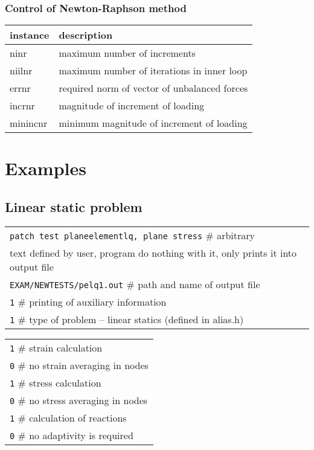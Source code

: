 \subsubsection{Control of Newton-Raphson method}

\begin{tabular}{|l|l|}
\hline
instance & description
\\ \hline
ninr &  maximum number of increments
\\ \hline
niilnr & maximum number of iterations in inner loop
\\ \hline
errnr & required norm of vector of unbalanced forces
\\ \hline
incrnr & magnitude of increment of loading
\\ \hline
minincnr & minimum magnitude of increment of loading
\\ \hline
\end{tabular}
  
\section{Examples}
\clearpage
\subsection{Linear static problem}

\noindent
\begin{tabular}{l}
{\tt patch test planeelementlq, plane stress} $\#$ arbitrary
\\
text defined by user, program do nothing with it, only
prints it into output file
\\
{\tt EXAM/NEWTESTS/pelq1.out} $\#$ path and name of output file
\\
{\tt 1} $\#$ printing of auxiliary information
\\
{\tt 1} $\#$ type of problem -- linear statics (defined in alias.h)
\\
\end{tabular}

\vspace{2mm}
\noindent
\begin{tabular}{l}
{\tt 1} $\#$ strain calculation
\\
{\tt 0} $\#$ no strain averaging in nodes
\\
{\tt 1} $\#$ stress calculation
\\
{\tt 0} $\#$ no stress averaging in nodes
\\
{\tt 1} $\#$ calculation of reactions
\\
{\tt 0} $\#$ no adaptivity is required
\\
\end{tabular}

